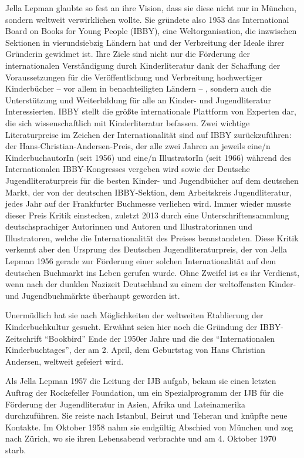 \documentclass[a4paper,
fontsize=11pt,
oneside,
numbers=noperiodatend,
parskip=half-,
bibliography=totoc,
final
]{scrartcl}
\begin{document}
Jella Lepman glaubte so fest an ihre Vision, dass sie diese nicht nur in
München, sondern weltweit verwirklichen wollte. Sie gründete also 1953
das International Board on Books for Young People (IBBY), eine
Weltorganisation, die inzwischen Sektionen in vierundsiebzig Ländern hat
und der Verbreitung der Ideale ihrer Gründerin gewidmet ist. Ihre Ziele
sind nicht nur die Förderung der internationalen Verständigung durch
Kinderliteratur dank der Schaffung der Voraussetzungen für die
Veröffentlichung und Verbreitung hochwertiger Kinderbücher -- vor allem
in benachteiligten Ländern -- , sondern auch die Unterstützung und
Weiterbildung für alle an Kinder- und Jugendliteratur Interessierten.
IBBY stellt die größte internationale Plattform von Experten dar, die
sich wissenschaftlich mit Kinderliteratur befassen. Zwei wichtige
Literaturpreise im Zeichen der Internationalität sind auf IBBY
zurückzuführen: der Hans-Christian-Andersen-Preis, der alle zwei Jahren
an jeweils eine/n KinderbuchautorIn (seit 1956) und eine/n IllustratorIn
(seit 1966) während des Internationalen IBBY-Kongresses vergeben wird
sowie der Deutsche Jugendliteraturpreis für die besten Kinder- und
Jugendbücher auf dem deutschen Markt, der von der deutschen
IBBY-Sektion, dem Arbeitskreis Jugendliteratur, jedes Jahr auf der
Frankfurter Buchmesse verliehen wird. Immer wieder musste dieser Preis
Kritik einstecken, zuletzt 2013 durch eine Unterschriftensammlung
deutschsprachiger Autorinnen und Autoren und Illustratorinnen und
Illustratoren, welche die Internationalität des Preises beanstandeten.
Diese Kritik verkennt aber den Ursprung des Deutschen
Jugendliteraturpreis, der von Jella Lepman 1956 gerade zur Förderung
einer solchen Internationalität auf dem deutschen Buchmarkt ins Leben
gerufen wurde. Ohne Zweifel ist es ihr Verdienst, wenn nach der dunklen
Nazizeit Deutschland zu einem der weltoffensten Kinder- und
Jugendbuchmärkte überhaupt geworden ist.~

Unermüdlich hat sie nach Möglichkeiten der weltweiten Etablierung der
Kinderbuchkultur gesucht. Erwähnt seien hier noch die Gründung der
IBBY-Zeitschrift \enquote{Bookbird} Ende der 1950er Jahre und die des
\enquote{Internationalen Kinderbuchtages}, der am 2. April, dem
Geburtstag von Hans Christian Andersen, weltweit gefeiert wird.

Als Jella Lepman 1957 die Leitung der IJB aufgab, bekam sie einen
letzten Auftrag der Rockefeller Foundation, um ein Spezialprogramm der
IJB für die Förderung der Jugendliteratur in Asien, Afrika und
Lateinamerika durchzuführen. Sie reiste nach Istanbul, Beirut und
Teheran und knüpfte neue Kontakte. Im Oktober 1958 nahm sie endgültig
Abschied von München und zog nach Zürich, wo sie ihren Lebensabend
verbrachte und am 4. Oktober 1970 starb.~
\end{document}
